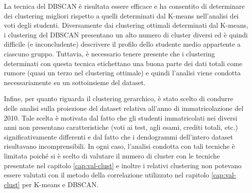 \documentclass[12pt]{article}
\begin{document}
La tecnica del DBSCAN è risultata essere efficace e ha consentito di determinare dei clustering migliori rispetto a quelli determinati dal K-means nell'analisi dei voti degli studenti. 
Diversamente dai clustering ottimali determinati dal K-means, i clustering del DBSCAN presentano un alto numero di cluster diversi ed è quindi difficile (e inconcludente) descrivere il profilo dello studente medio appartente a ciascuno gruppo. 
Tuttavia, è necessario tenere presente che i clustering determinati con questa tecnica etichettano una buona parte dei dati totali come rumore (quasi un terzo nel clustering ottimale) e quindi l'analisi viene condotta necessaria\-mente su un sottoinsieme del dataset. 

Infine, per quanto riguarda il clustering gerarchico, è stato scelto di condurre delle analisi sulla proiezione del dataset relativa all'anno di im\-matricolazione del 2010. 
Tale scelta è motivata dal fatto che gli studenti imma\-tricolati nei diversi anni non presentano caratteristiche (voti ai test, agli esami, crediti totali, etc.) significativamente differenti e dal fatto che i dendogrammi dell'intero dataset risultavano incomprensibili. 
In ogni caso, l'analisi condotta con tali tecniche è limitata poiché si è scelto di valutare il numero di cluster con le tecniche presentate nel capitolo \ref{cap:val-clust} e inoltre i relativi clustering non potevano essere valutati con il metodo della correlazione utilizzato nel capitolo \ref{cap:val-clust} per K-means e DBSCAN.
\newpage 

\listoffigures
 
\newpage


\listoftables

\newpage

\end{document}
